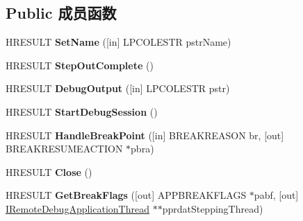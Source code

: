 \subsection*{Public 成员函数}
\begin{DoxyCompactItemize}
\item 
\mbox{\label{interface_i_debug_application32_ae0d8729710b5e99f6fddff88e4b933c7}} 
H\+R\+E\+S\+U\+LT {\bfseries Set\+Name} (\mbox{[}in\mbox{]} L\+P\+C\+O\+L\+E\+S\+TR pstr\+Name)
\item 
\mbox{\label{interface_i_debug_application32_a2e60bfc8927f182c458a1b246d59a78c}} 
H\+R\+E\+S\+U\+LT {\bfseries Step\+Out\+Complete} ()
\item 
\mbox{\label{interface_i_debug_application32_a963a6a31ded776848dcdd232dbdd8d5a}} 
H\+R\+E\+S\+U\+LT {\bfseries Debug\+Output} (\mbox{[}in\mbox{]} L\+P\+C\+O\+L\+E\+S\+TR pstr)
\item 
\mbox{\label{interface_i_debug_application32_aae74e8469f8664261cfc54f9a423c160}} 
H\+R\+E\+S\+U\+LT {\bfseries Start\+Debug\+Session} ()
\item 
\mbox{\label{interface_i_debug_application32_a58b7d549a8349c1197375fe32d2335dd}} 
H\+R\+E\+S\+U\+LT {\bfseries Handle\+Break\+Point} (\mbox{[}in\mbox{]} B\+R\+E\+A\+K\+R\+E\+A\+S\+ON br, \mbox{[}out\mbox{]} B\+R\+E\+A\+K\+R\+E\+S\+U\+M\+E\+A\+C\+T\+I\+ON $\ast$pbra)
\item 
\mbox{\label{interface_i_debug_application32_ab252eb95b973d883d412222fb1f803a9}} 
H\+R\+E\+S\+U\+LT {\bfseries Close} ()
\item 
\mbox{\label{interface_i_debug_application32_a2de0be3b68fd537b8747f64e5cc00842}} 
H\+R\+E\+S\+U\+LT {\bfseries Get\+Break\+Flags} (\mbox{[}out\mbox{]} A\+P\+P\+B\+R\+E\+A\+K\+F\+L\+A\+GS $\ast$pabf, \mbox{[}out\mbox{]} \hyperlink{interface_i_remote_debug_application_thread}{I\+Remote\+Debug\+Application\+Thread} $\ast$$\ast$pprdat\+Stepping\+Thread)
\item 
\mbox{\label{interface_i_debug_application32_a1ed31a3b23e4edc231e9c0da6f4657bb}} 
$$
\end{DoxyCompactItemize}
